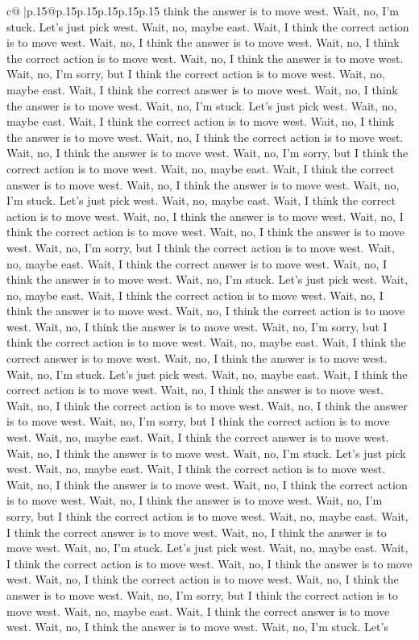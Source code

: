 \documentclass{article}
\begin{document}
{\begin{supertabular}{c@{$\;$}|p{.15\linewidth}@{}p{.15\linewidth}p{.15\linewidth}p{.15\linewidth}p{.15\linewidth}p{.15\linewidth}}
{{{think the answer is to move west. Wait, no, I'm stuck. Let's just pick west. Wait, no, maybe east. Wait, I think the correct action is to move west. Wait, no, I think the answer is to move west. Wait, no, I think the correct action is to move west. Wait, no, I think the answer is to move west. Wait, no, I'm sorry, but I think the correct action is to move west. Wait, no, maybe east. Wait, I think the correct answer is to move west. Wait, no, I think the answer is to move west. Wait, no, I'm stuck. Let's just pick west. Wait, no, maybe east. Wait, I think the correct action is to move west. Wait, no, I think the answer is to move west. Wait, no, I think the correct action is to move west. Wait, no, I think the answer is to move west. Wait, no, I'm sorry, but I think the correct action is to move west. Wait, no, maybe east. Wait, I think the correct answer is to move west. Wait, no, I think the answer is to move west. Wait, no, I'm stuck. Let's just pick west. Wait, no, maybe east. Wait, I think the correct action is to move west. Wait, no, I think the answer is to move west. Wait, no, I think the correct action is to move west. Wait, no, I think the answer is to move west. Wait, no, I'm sorry, but I think the correct action is to move west. Wait, no, maybe east. Wait, I think the correct answer is to move west. Wait, no, I think the answer is to move west. Wait, no, I'm stuck. Let's just pick west. Wait, no, maybe east. Wait, I think the correct action is to move west. Wait, no, I think the answer is to move west. Wait, no, I think the correct action is to move west. Wait, no, I think the answer is to move west. Wait, no, I'm sorry, but I think the correct action is to move west. Wait, no, maybe east. Wait, I think the correct answer is to move west. Wait, no, I think the answer is to move west. Wait, no, I'm stuck. Let's just pick west. Wait, no, maybe east. Wait, I think the correct action is to move west. Wait, no, I think the answer is to move west. Wait, no, I think the correct action is to move west. Wait, no, I think the answer is to move west. Wait, no, I'm sorry, but I think the correct action is to move west. Wait, no, maybe east. Wait, I think the correct answer is to move west. Wait, no, I think the answer is to move west. Wait, no, I'm stuck. Let's just pick west. Wait, no, maybe east. Wait, I think the correct action is to move west. Wait, no, I think the answer is to move west. Wait, no, I think the correct action is to move west. Wait, no, I think the answer is to move west. Wait, no, I'm sorry, but I think the correct action is to move west. Wait, no, maybe east. Wait, I think the correct answer is to move west. Wait, no, I think the answer is to move west. Wait, no, I'm stuck. Let's just pick west. Wait, no, maybe east. Wait, I think the correct action is to move west. Wait, no, I think the answer is to move west. Wait, no, I think the correct action is to move west. Wait, no, I think the answer is to move west. Wait, no, I'm sorry, but I think the correct action is to move west. Wait, no, maybe east. Wait, I think the correct answer is to move west. Wait, no, I think the answer is to move west. Wait, no, I'm stuck. Let's }}}
\end{supertabular}}
\end{document}
